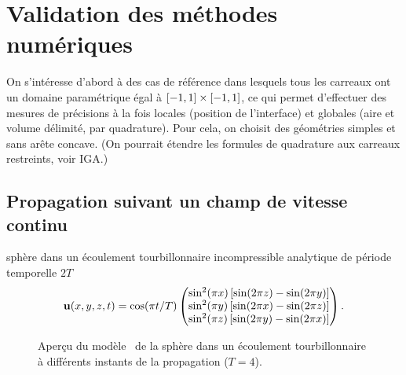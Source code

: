 \chapter{Validation des méthodes numériques}

On s'intéresse d'abord à des cas de référence dans lesquels tous les carreaux ont un domaine paramétrique égal à $\left[ -1, 1 \right] \times \left[ -1, 1 \right]$, ce qui permet d'effectuer des mesures de précisions à la fois locales (position de l'interface) et globales (aire et volume délimité, par quadrature). 
Pour cela, on choisit des géométries simples et sans arête concave.
(On pourrait étendre les formules de quadrature aux carreaux restreints, voir IGA.)

\section{Propagation suivant un champ de vitesse continu}

sphère dans un écoulement tourbillonnaire incompressible analytique de période temporelle $2T$
\begin{equation}
	\mathbf{u}(x,y,z,t) = 
	\cos( \pi t/T )
	\begin{pmatrix} 
	\sin^2(\pi x) \left[ \sin(2\pi z) - \sin(2\pi y)\right] \\
\sin^2(\pi y) \left[ \sin(2\pi x) - \sin(2\pi z)\right] \\
\sin^2(\pi z) \left[ \sin(2\pi y) - \sin(2\pi x)\right]
	 \end{pmatrix}.
\end{equation}

\begin{figure}
	\centering
	
	\caption{Aperçu du modèle \brep\ de la sphère dans un écoulement tourbillonnaire à différents instants de la propagation ($T=4$).}
	\label{fig:snapshots_vortex}
\end{figure}

